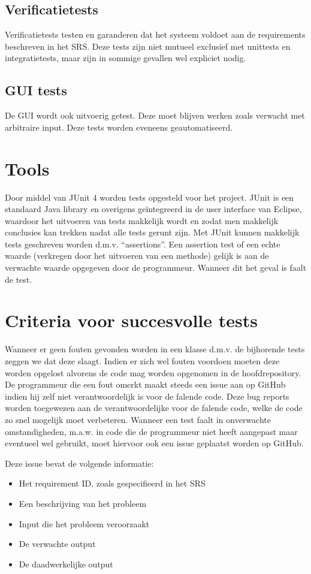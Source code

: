 \subsection{Verificatietests}
Verificatietests testen en garanderen dat het systeem voldoet aan de requirements beschreven in het SRS\cite{srs}. 
Deze tests zijn niet mutueel exclusief met unittests en integratietests, maar zijn in sommige gevallen wel expliciet nodig.

\subsection{GUI tests}
De GUI wordt ook uitvoerig getest. Deze moet blijven werken zoals verwacht met arbitraire input. Deze tests worden eveneens geautomatiseerd.

\section{Tools}
Door middel van JUnit 4\cite{junit} worden tests opgesteld voor het project. 
JUnit is een standaard Java library en overigens geïntegreerd in de user interface van Eclipse, waardoor het uitvoeren van tests makkelijk wordt en zodat men makkelijk conclusies kan trekken nadat alle tests gerunt zijn. 
Met JUnit kunnen makkelijk tests geschreven worden d.m.v. ``assertions''. 
Een assertion test of een echte waarde (verkregen door het uitvoeren van een methode) gelijk is aan de verwachte waarde opgegeven door de programmeur. Wanneer dit het geval is faalt de test. 	

\section{Criteria voor succesvolle tests}
Wanneer er geen fouten gevonden worden in een klasse d.m.v. de bijhorende tests zeggen we dat deze slaagt. 
Indien er zich wel fouten voordoen moeten deze worden opgelost alvorens de code mag worden opgenomen in de hoofdrepository.
De programmeur die een fout omerkt maakt steeds een issue aan op GitHub indien hij zelf niet verantwoordelijk is voor de falende code.
Deze bug reports worden toegewezen aan de verantwoordelijke voor de falende code, welke de code zo snel mogelijk moet verbeteren. 
Wanneer een test faalt in onverwachte omstandigheden, m.a.w. in code die de programmeur niet heeft aangepast maar eventueel wel gebruikt, moet hiervoor ook een issue geplaatst worden op GitHub.

\noindent
Deze issue bevat de volgende informatie:
\begin{itemize}
	\item Het requirement ID, zoals gespecifieerd in het SRS\cite{srs}
	\item Een beschrijving van het probleem
	\item Input die het probleem veroorzaakt
	\item De verwachte output
	\item De daadwerkelijke output
\end{itemize}

